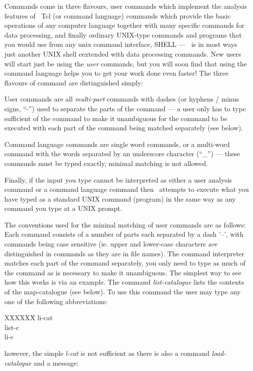 Commands come in three flavours, user commands which implement the
analysis features of \Anmap\, Tcl (or command language) commands
which provide the basic operations of any computer language together
with many specific commands for data processing, and finally
ordinary UNIX-type commands and programs that you would use from
any unix command interface, SHELL --- \Anmap\ is in most ways just
another UNIX shell eextended with data processing commands.
New users will start just be using the {\em user} commands, 
but you will soon find that using the command language helps 
you to get your work done even faster!  The three flavours of command 
are distinguished simply:
\begin{npars}
\item User commands are all {\em multi-part} commands with
dashes (or hyphens / minus signs, ``-'') used to separate the parts of the
command --- a user only has to type sufficient of the command to
make it unambiguous for the command to be executed with each part
of the command being matched separately (see below).
\item Command language commands are single word commands, or
a multi-word command with the words separated by an underscore
character (``\_'') --- these commands must be typed exactly, minimal
matching is not allowed.
\item Finally, if the input you type cannot be interpreted as either
a user analysis command or a command language command then \Anmap\
attempts to execute what you have typed as a standard UNIX command
(program) in the same way as any command you type at a UNIX prompt.
\end{npars}
 
The conventions used for the mininal matching of user commands
are as follows:
Each command consists of a number of parts each separated by a
dash '--', with commands being case sensitive (ie. upper and lower-case 
characters {\em are} distinguished in commands as they are in
file names). The command
interpreter matches each part of the command separately, you
only need to type as much of the command as is necessary to
make it unambiguous. The simplest way to see how this works is
via an example. The command {\em list-catalogue} lists the contents
of the map-catalogue (see below). To use this command the user
may type any one of the following abbreviations:
\begin{tabbing}
XXXXXX\= \kill 
\>li-cat \\
\>list-c \\
\>li-c \\
\end{tabbing}
however, the simple {\em l-cat} 
is not sufficient as there is also a command {\em load-catalogue}
and a message:

